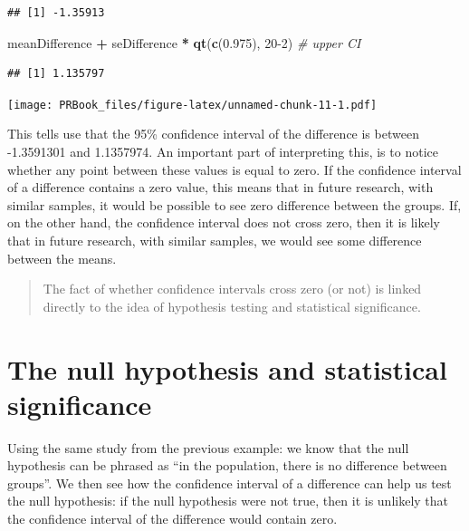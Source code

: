 \documentclass[
]{book}
\newenvironment{Shaded}{\begin{snugshade}}{\end{snugshade}}
\newcommand{\CommentTok}[1]{\textcolor[rgb]{0.56,0.35,0.01}{\textit{#1}}}
\newcommand{\DecValTok}[1]{\textcolor[rgb]{0.00,0.00,0.81}{#1}}
\newcommand{\FloatTok}[1]{\textcolor[rgb]{0.00,0.00,0.81}{#1}}
\newcommand{\KeywordTok}[1]{\textcolor[rgb]{0.13,0.29,0.53}{\textbf{#1}}}
\newcommand{\NormalTok}[1]{#1}
\newcommand{\OperatorTok}[1]{\textcolor[rgb]{0.81,0.36,0.00}{\textbf{#1}}}
\newcommand{\StringTok}[1]{\textcolor[rgb]{0.31,0.60,0.02}{#1}}
\begin{document}
\begin{verbatim}
## [1] -1.35913
\end{verbatim}

\begin{Shaded}
\begin{Highlighting}[]
\NormalTok{meanDifference }\OperatorTok{+}\StringTok{ }\NormalTok{seDifference }\OperatorTok{*}\StringTok{ }\KeywordTok{qt}\NormalTok{(}\KeywordTok{c}\NormalTok{(}\FloatTok{0.975}\NormalTok{), }\DecValTok{20-2}\NormalTok{) }\CommentTok{# upper CI}
\end{Highlighting}
\end{Shaded}

\begin{verbatim}
## [1] 1.135797
\end{verbatim}

\texttt{[image: PRBook\_files/figure-latex/unnamed-chunk-11-1.pdf]}

This tells use that the 95\% confidence interval of the difference is between -1.3591301 and 1.1357974. An important part of interpreting this, is to notice whether any point between these values is equal to zero. If the confidence interval of a difference contains a zero value, this means that in future research, with similar samples, it would be possible to see zero difference between the groups. If, on the other hand, the confidence interval does not cross zero, then it is likely that in future research, with similar samples, we would see some difference between the means.

\begin{quote}
The fact of whether confidence intervals cross zero (or not) is linked directly to the idea of hypothesis testing and statistical significance.
\end{quote}

\hypertarget{the-null-hypothesis-and-statistical-significance}{%
\section{The null hypothesis and statistical significance}\label{the-null-hypothesis-and-statistical-significance}}

Using the same study from the previous example: we know that the null hypothesis can be phrased as ``in the population, there is no difference between groups''. We then see how the confidence interval of a difference can help us test the null hypothesis: if the null hypothesis were not true, then it is unlikely that the confidence interval of the difference would contain zero.
\end{document}
